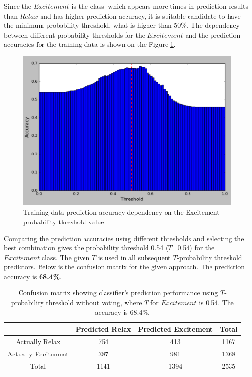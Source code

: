 \documentclass[12pt]{article}
\theoremstyle{definition}
\begin{document}
Since the $Excitement$ is the class, which appears more times in prediction results than $Relax$ and has higher prediction accuracy, it is suitable candidate to have the minimum probability threshold, what is higher than 50\%. The dependency between different probability thresholds for the $Excitement$ and the prediction accuracies for the training data is shown on the Figure \ref{fig:probability_thresholds}.
\begin{figure} [H]
\begin{center}
\includegraphics[width=1\textwidth]{probability_thresholds}
\caption{Training data prediction accuracy dependency on the Excitement probability threshold value.}
\label{fig:probability_thresholds}
\end{center}
\end{figure}

Comparing the prediction accuracies using different thresholds and selecting the best combination gives the probability threshold 0.54 ($T$=0.54) for the $Excitement$ class. The given $T$ is used in all subsequent $T$-probability threshold predictors. Below is the confusion matrix for the given approach. The prediction accuracy is \textbf{68.4\%}.

\begin{table}[H]
\begin{center}
  \begin{tabular}{ | c | c | c | c | }
    \hline
     & Predicted Relax & Predicted Excitement & Total \\ \hline
    Actually Relax & 754 & 413 & 1167 \\ \hline
    Actually Excitement & 387 & 981 & 1368 \\ \hline
    Total & 1141 & 1394 & 2535 \\ 
    \hline
  \end{tabular}
\end{center}
\caption{Confusion matrix showing classifier's prediction performance using $T$-probability threshold without voting, where $T$ for $Excitement$ is 0.54. The accuracy is 68.4\%.} \label{tab:title} 
\end{table}
\end{document}
